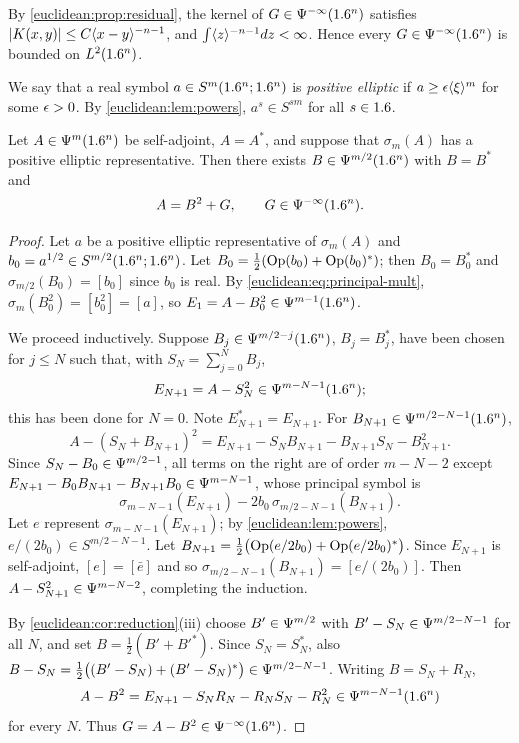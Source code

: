 By \cref{euclidean:prop:residual}, the kernel of $G\in\Psi^{-\infty}(1.6^n)$
satisfies $\lvert K(x,y)\rvert\le C\langle x-y\rangle^{-n-1}$, and
$\int\langle z\rangle^{-n-1}dz<\infty$. Hence every $G\in\Psi^{-\infty}(1.6^n)$ is
bounded on $L^2(1.6^n)$.

We say that a real symbol $a\in S^m(1.6^n;1.6^n)$ is \emph{positive elliptic}
if $a\ge\epsilon\langle \xi\rangle^m$ for some $\epsilon>0$. By
\cref{euclidean:lem:powers}, $a^{s}\in S^{sm}$ for all $s\in1.6$.

\begin{proposition}\label{euclidean:prop:sqrt}
  Let $A\in\Psi^{m}(1.6^n)$ be self-adjoint, $A=A^*$, and suppose that
  $\sigma_m(A)$ has a positive elliptic representative. Then there exists
  $B\in\Psi^{m/2}(1.6^n)$ with $B=B^*$ and
  \begin{equation*}
    A=B^2+G,\qquad G\in\Psi^{-\infty}(1.6^n).
  \end{equation*}
\end{proposition}
\begin{proof}
  Let $a$ be a positive elliptic representative of $\sigma_m(A)$ and
  $b_0=a^{1/2}\in S^{m/2}(1.6^n;1.6^n)$. Let $B_0=\frac12(\operatorname{Op}(b_0)+\operatorname{Op}(b_0)^*)$;
  then $B_0=B_0^*$ and $\sigma_{m/2}(B_0)=[b_0]$ since $b_0$ is real. By
  \eqref{euclidean:eq:principal-mult}, $\sigma_m(B_0^2)=[b_0^2]=[a]$, so
  $E_1=A-B_0^2\in\Psi^{m-1}(1.6^n)$.

  We proceed inductively. Suppose $B_j\in\Psi^{m/2-j}(1.6^n)$, $B_j=B_j^*$,
  have been chosen for $j\le N$ such that, with $S_N=\sum_{j=0}^NB_j$,
  \begin{equation*}
    E_{N+1}=A-S_N^2\in\Psi^{m-N-1}(1.6^n);
  \end{equation*}
  this has been done for $N=0$. Note $E_{N+1}^*=E_{N+1}$. For
  $B_{N+1}\in\Psi^{m/2-N-1}(1.6^n)$,
  \begin{equation*}
    A-(S_N+B_{N+1})^2=E_{N+1}-S_NB_{N+1}-B_{N+1}S_N-B_{N+1}^2.
  \end{equation*}
  Since $S_N-B_0\in\Psi^{m/2-1}$, all terms on the right are of order
  $m-N-2$ except $E_{N+1}-B_0B_{N+1}-B_{N+1}B_0\in\Psi^{m-N-1}$, whose
  principal symbol is
  \begin{equation*}
    \sigma_{m-N-1}(E_{N+1})-2b_0\,\sigma_{m/2-N-1}(B_{N+1}).
  \end{equation*}
  Let $e$ represent $\sigma_{m-N-1}(E_{N+1})$; by \cref{euclidean:lem:powers},
  $e/(2b_0)\in S^{m/2-N-1}$. Let
  $B_{N+1}=\frac12\bigl(\operatorname{Op}(e/2b_0)+\operatorname{Op}(e/2b_0)^*\bigr)$. Since
  $E_{N+1}$ is self-adjoint, $[e]=[\bar e]$ and so
  $\sigma_{m/2-N-1}(B_{N+1})=[e/(2b_0)]$. Then
  $A-S_{N+1}^2\in\Psi^{m-N-2}$, completing the induction.

  By \cref{euclidean:cor:reduction}(iii) choose $B'\in\Psi^{m/2}$ with
  $B'-S_N\in\Psi^{m/2-N-1}$ for all $N$, and set $B=\frac12(B'+B'^*)$. Since
  $S_N=S_N^*$, also $B-S_N=\frac12\bigl((B'-S_N)+(B'-S_N)^*\bigr)\in\Psi^{m/2-N-1}$.
  Writing $B=S_N+R_N$,
  \begin{equation*}
    A-B^2=E_{N+1}-S_NR_N-R_NS_N-R_N^2\in\Psi^{m-N-1}(1.6^n)
  \end{equation*}
  for every $N$. Thus $G=A-B^2\in\Psi^{-\infty}(1.6^n)$.
\end{proof}

